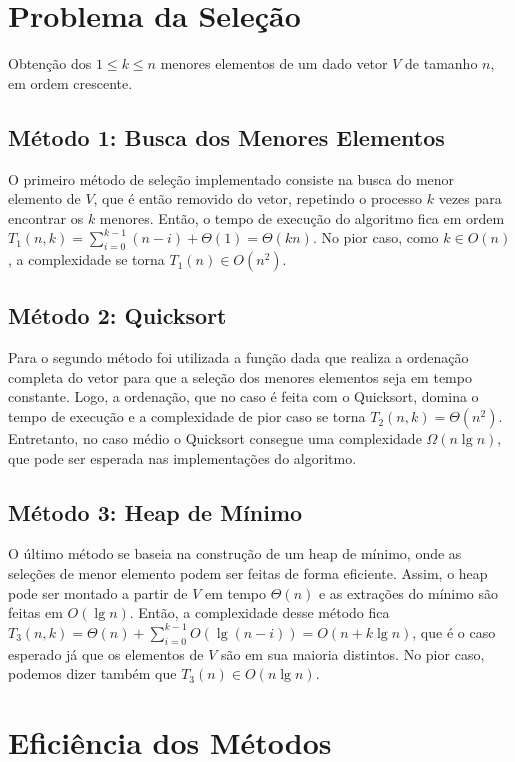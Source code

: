 \section{Problema da Seleção}

Obtenção dos $1 \leq k \leq n$ menores elementos de um dado vetor $V$ de tamanho $n$, em ordem crescente.

\subsection{Método 1: Busca dos Menores Elementos}

O primeiro método de seleção implementado consiste na busca do menor elemento de $V$, que é então removido do vetor, repetindo o processo $k$ vezes para encontrar os $k$ menores. Então, o tempo de execução do algoritmo fica em ordem $T_1(n, k) = \sum_{i = 0}^{k-1} (n - i) + \Theta(1) = \Theta(k n)$. No pior caso, como $k \in O(n)$, a complexidade se torna $T_1(n) \in O\left(n^2\right)$.

\subsection{Método 2: Quicksort}

Para o segundo método foi utilizada a função dada que realiza a ordenação completa do vetor para que a seleção dos menores elementos seja em tempo constante. Logo, a ordenação, que no caso é feita com o Quicksort, domina o tempo de execução e a complexidade de pior caso se torna $T_2(n, k) = \Theta\left(n^2\right)$. Entretanto, no caso médio o Quicksort consegue uma complexidade $\Omega(n \lg n)$, que pode ser esperada nas implementações do algoritmo.

\subsection{Método 3: Heap de Mínimo}

O último método se baseia na construção de um heap de mínimo, onde as seleções de menor elemento podem ser feitas de forma eficiente. Assim, o heap pode ser montado a partir de $V$ em tempo $\Theta(n)$ e as extrações do mínimo são feitas em $O(\lg n)$. Então, a complexidade desse método fica $T_3(n, k) = \Theta(n) + \sum_{i = 0}^{k - 1} O(\lg (n - i)) = O(n + k \lg n)$, que é o caso esperado já que os elementos de $V$ são em sua maioria distintos. No pior caso, podemos dizer também que $T_3(n) \in O(n \lg n)$.

\section{Eficiência dos Métodos}


